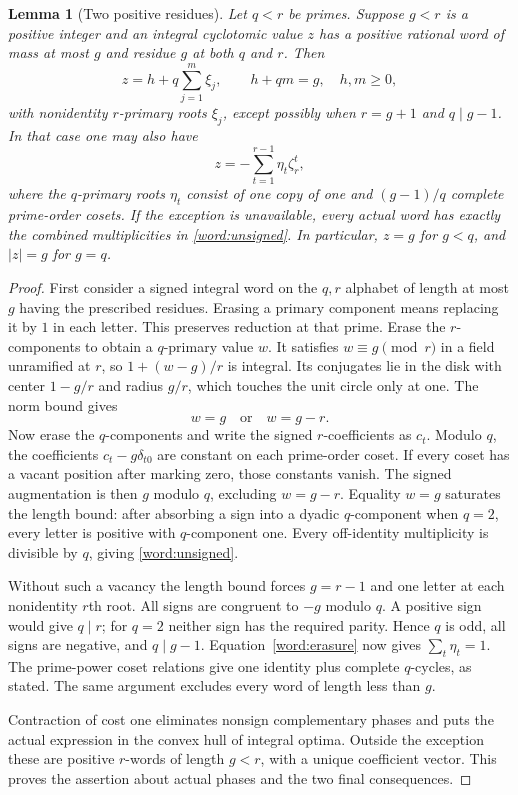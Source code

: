 \documentclass[11pt,a4paper]{article}
\numberwithin{equation}{section}
\newtheorem{lemma}[theorem]{Lemma}
\begin{document}
\begin{lemma}[Two positive residues]\label{word:two-residues}
Let $q<r$ be primes. Suppose $g<r$ is a positive integer and an
integral cyclotomic value $z$ has a positive rational word of mass
at most $g$ and residue $g$ at both $q$ and $r$. Then
\begin{equation}\label{word:unsigned}
 z=h+q\sum_{j=1}^m\xi_j,
 \qquad h+qm=g,\quad h,m\ge0,
\end{equation}
with nonidentity $r$-primary roots $\xi_j$, except possibly when
$r=g+1$ and $q\mid g-1$. In that case one may also have
\begin{equation}\label{word:signed}
 z=-\sum_{t=1}^{r-1}\eta_t\zeta_r^t,
\end{equation}
where the $q$-primary roots $\eta_t$ consist of one copy of one
and $(g-1)/q$ complete prime-order cosets.
If the exception is unavailable, every actual word has exactly
the combined multiplicities in \eqref{word:unsigned}.
In particular, $z=g$ for $g<q$, and $|z|=g$ for $g=q$.
\end{lemma}
\begin{proof}
First consider a signed integral word on the $q,r$ alphabet of
length at most $g$ having the prescribed residues. Erasing a primary
component means replacing it by $1$ in each letter. This preserves
reduction at that prime. Erase the $r$-components to obtain a
$q$-primary value $w$. It satisfies $w\equiv g\pmod r$ in a
field unramified at $r$, so $1+(w-g)/r$ is integral. Its conjugates
lie in the disk with center $1-g/r$ and radius $g/r$, which touches
the unit circle only at one. The norm bound gives
\begin{equation}\label{word:erasure}
                         w=g\quad\text{or}\quad w=g-r.
\end{equation}
Now erase the $q$-components and write the signed $r$-coefficients
as $c_t$. Modulo $q$, the coefficients $c_t-g\delta_{t0}$ are
constant on each prime-order coset. If every coset has a vacant
position after marking zero, those constants vanish. The signed
augmentation is then $g$ modulo $q$, excluding $w=g-r$.
Equality $w=g$ saturates the length bound: after absorbing a sign
into a dyadic $q$-component when $q=2$, every letter is positive
with $q$-component one. Every off-identity multiplicity is divisible
by $q$, giving \eqref{word:unsigned}.

Without such a vacancy the length bound forces $g=r-1$ and one
letter at each nonidentity $r$th root. All signs are congruent to
$-g$ modulo $q$. A positive sign would give $q\mid r$; for $q=2$
neither sign has the required parity. Hence $q$ is odd, all signs
are negative, and $q\mid g-1$. Equation~\eqref{word:erasure}
now gives $\sum_t\eta_t=1$. The prime-power coset relations
give one identity plus complete $q$-cycles, as stated.
The same argument excludes every word of length less than $g$.

Contraction of cost one eliminates nonsign complementary phases
and puts the actual expression in the convex hull of integral
optima. Outside the exception these are positive $r$-words of
length $g<r$, with a unique coefficient vector. This proves the
assertion about actual phases and the two final consequences.
\end{proof}
\end{document}
